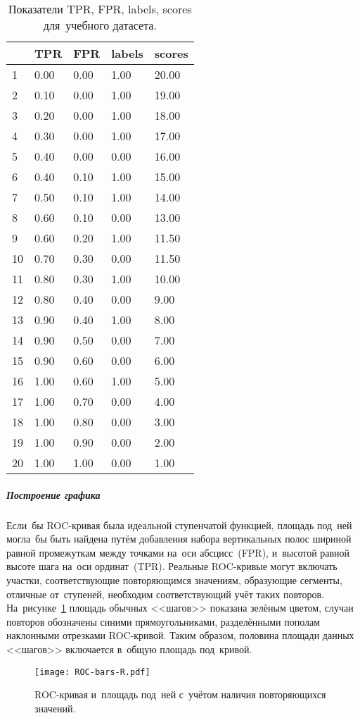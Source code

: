 \documentclass[]{scrreprt}
\begin{document}
\begin{table}[ht]
	\caption{Показатели TPR, FPR, labels, scores для~учебного датасета.}\label{tab:roc_df-r}
	\centering
	\begin{tabular}{lllll}
		\hline
		& TPR & FPR & labels & scores \\ 
		\hline
		1 & 0.00 & 0.00 & 1.00 & 20.00 \\ 
		2 & 0.10 & 0.00 & 1.00 & 19.00 \\ 
		3 & 0.20 & 0.00 & 1.00 & 18.00 \\ 
		4 & 0.30 & 0.00 & 1.00 & 17.00 \\ 
		5 & 0.40 & 0.00 & 0.00 & 16.00 \\ 
		6 & 0.40 & 0.10 & 1.00 & 15.00 \\ 
		7 & 0.50 & 0.10 & 1.00 & 14.00 \\ 
		8 & 0.60 & 0.10 & 0.00 & 13.00 \\ 
		9 & 0.60 & 0.20 & 1.00 & 11.50 \\ 
		10 & 0.70 & 0.30 & 0.00 & 11.50 \\ 
		11 & 0.80 & 0.30 & 1.00 & 10.00 \\ 
		12 & 0.80 & 0.40 & 0.00 & 9.00 \\ 
		13 & 0.90 & 0.40 & 1.00 & 8.00 \\ 
		14 & 0.90 & 0.50 & 0.00 & 7.00 \\ 
		15 & 0.90 & 0.60 & 0.00 & 6.00 \\ 
		16 & 1.00 & 0.60 & 1.00 & 5.00 \\ 
		17 & 1.00 & 0.70 & 0.00 & 4.00 \\ 
		18 & 1.00 & 0.80 & 0.00 & 3.00 \\ 
		19 & 1.00 & 0.90 & 0.00 & 2.00 \\ 
		20 & 1.00 & 1.00 & 0.00 & 1.00 \\ 
		\hline
	\end{tabular}
\end{table}
%
\subparagraph{Построение графика}
Если~бы ROC-кривая была идеальной ступенчатой функцией, площадь под~ней могла~бы быть найдена путём добавления набора вертикальных полос шириной равной промежуткам между точками на~оси абсцисс~(FPR), и~высотой равной высоте шага на~оси ординат~(TPR). Реальные ROC-кривые могут включать участки, соответствующие повторяющимся значениям, образующие сегменты, отличные от~ступеней, необходим соответствующий учёт таких повторов. На~рисунке~\ref{fig:ROC-bars-R} площадь обычных <<шагов>> показана зелёным цветом, случаи повторов обозначены синими прямоугольниками, разделёнными пополам наклонными отрезками ROC-кривой. Таким образом, половина площади данных <<шагов>> включается в~общую площадь под~кривой.
%
\begin{figure}[ht]
	\centering
	\texttt{[image: ROC-bars-R.pdf]}
	\caption{ROC-кривая и~площадь под~ней с~учётом наличия повторяющихся значений.}
	\label{fig:ROC-bars-R}
\end{figure}
%
\end{document}
